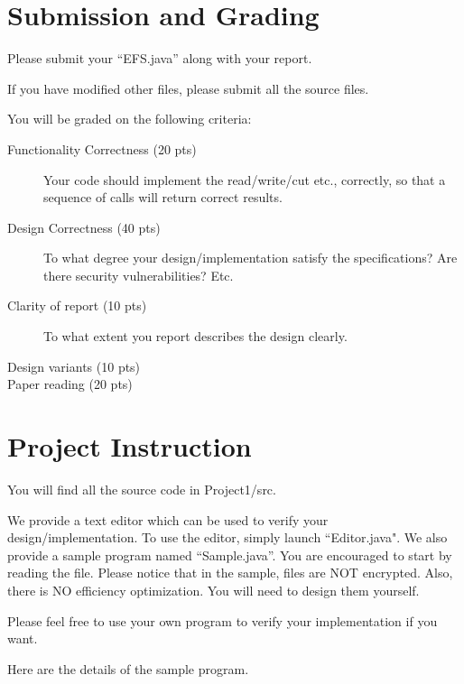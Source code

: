 \documentclass[11pt]{article}
\begin{document}
\section{Submission and Grading}
Please submit your ``EFS.java'' along with your report.

If you have modified other files, please submit all the source files.

You will be graded on the following criteria:

\begin{description}
 \item[Functionality Correctness (20 pts)]
Your code should implement the read/write/cut etc., correctly, so that a sequence of calls will return correct results. 

 \item[Design Correctness (40 pts)]
To what degree your design/implementation satisfy the specifications?  Are there security vulnerabilities? Etc.

 \item[Clarity of report (10 pts)]
To what extent you report describes the design clearly.

 \item[Design variants (10 pts)]

 \item[Paper reading (20 pts)]
\end{description}


\section{Project Instruction}

You will find all the source code in Project1/src.

We provide a text editor which can be used to verify your design/implementation. To use the editor, simply launch ``Editor.java". We also provide a sample program named ``Sample.java''. You are encouraged to start by reading the file. Please notice that in the sample, files are NOT encrypted. Also, there is NO efficiency optimization. You will need to design them yourself.

Please feel free to use your own program to verify your implementation if you want.

Here are the details of the sample program.
\end{document}
